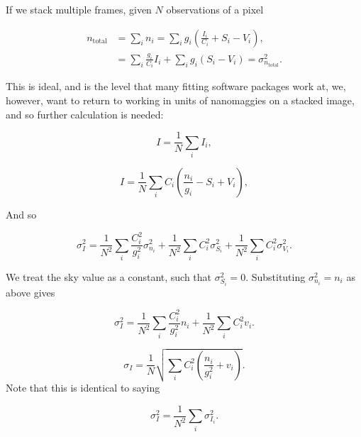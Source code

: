 \documentclass[../main.tex]{subfiles}
\begin{document}
If we stack multiple frames, given $N$ observations of a pixel

\begin{equation}
  \begin{aligned}
n_\mathrm{total} &= \sum_i{n_i} = \sum_i g_i\left(\frac{I_i}{C_i} + S_i - V_i\right),\\
                 &= \sum_{i}\frac{g_i}{C_i}I_i + \sum_i{g_i \left(S_i - V_i\right)} = \sigma_{n_\mathrm{total}}^2.
  \end{aligned}
\end{equation}

This is ideal, and is the level that many fitting software packages work at, we, however, want to return to working in units of nanomaggies on a stacked image, and so further calculation is needed:

\begin{equation}
I = \frac{1}{N}\sum_i I_i,
\end{equation}

\begin{equation}
I = \frac{1}{N}\sum_i C_i\left(\frac{n_i}{g_i} - S_i + V_i\right),
\end{equation}

And so

\begin{equation}
  \sigma_I^2 = \frac{1}{N^2}\sum_i\frac{C_i^2}{g_i^2}\sigma_{n_i}^2 + \frac{1}{N^2}\sum_i C_i^2 \sigma_{S_i}^2 + \frac{1}{N^2}\sum_i C_i^2 \sigma_{V_i}^2.
\end{equation}

We treat the sky value as a constant, such that $\sigma_{S_i}^2 = 0$. Substituting $\sigma_{n_i}^2 = n_i$ as above gives

\begin{equation}
  \sigma_I^2 = \frac{1}{N^2}\sum_i\frac{C_i^2}{g_i^2}n_i + \frac{1}{N^2}\sum_i C_i^2 v_i.
\end{equation}

\begin{equation}
  \sigma_I = \frac{1}{N}\sqrt{\sum_i C_i^2\left(\frac{n_i}{g_i^2} + v_i\right)}.
\end{equation}
Note that this is identical to saying

\begin{equation}
\sigma_I^2 = \frac{1}{N^2}\sum_i\sigma_{I_i}^2.
\end{equation}
\end{document}
